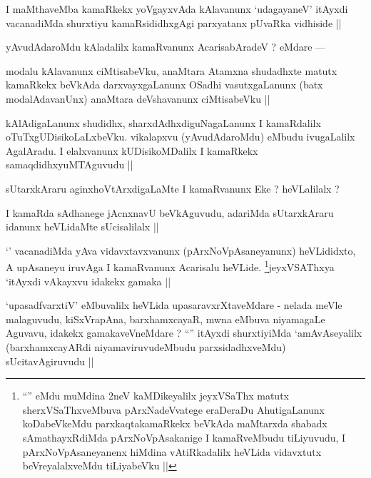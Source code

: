 
\begin{artha}
I maMthaveMba kamaRkekx yoVgayxvAda kAlavanunx `udagayaneV' itAyxdi vacanadiMda shurxtiyu kamaRsididhxgAgi parxyatanx pUvaRka vidhiside ||
\end{artha}

\begin{artha}
yAvudAdaroMdu kAladalilx kamaRvanunx AcarisabAradeV ? eMdare ---
\end{artha}

\begin{artha}
modalu kAlavanunx ciMtisabeVku, anaMtara Atamxna shudadhxte matutx kamaRkekx beVkAda darxvayxgaLanunx OSadhi vasutxgaLanunx (batx modalAdavanUnx) anaMtara deVshavanunx ciMtisabeVku ||
\end{artha}

\begin{artha}
kAlAdigaLanunx shudidhx, sharxdAdhxdiguNagaLanunx I kamaRdalilx oTuTxgUDisikoLaLxbeVku. vikalapxvu (yAvudAdaroMdu) eMbudu ivugaLalilx AgalAradu. I elalxvanunx kUDisikoMDalilx I kamaRkekx samaqdidhxyuMTAguvudu ||
\end{artha}

\begin{artha}
sUtarxkAraru aginxhoVtArxdigaLaMte I kamaRvanunx Eke ? heVLalilalx ?
\end{artha}

\begin{artha}
I kamaRda sAdhanege jAcnxnavU beVkAguvudu, adariMda sUtarxkAraru idanunx heVLidaMte sUcisalilalx ||
\end{artha}

\begin{artha}
`\stext' vacanadiMda yAva vidavxtavxvanunx (pArxNoVpAsaneyanunx) heVLididxto, A upAsaneyu iruvAga I kamaRvanunx Acarisalu heVLide. \footnote{``\stext'' eMdu muMdina 2neV kaMDikeyalilx jeyxVSaThx matutx sherxVSaThxveMbuva pArxNadeVvatege eraDeraDu AhutigaLanunx koDabeVkeMdu parxkaqtakamaRkekx beVkAda maMtarxda shabadx sAmathayxRdiMda pArxNoVpAsakanige I kamaRveMbudu tiLiyuvudu, I pArxNoVpAsaneyanenx hiMdina vAtiRkadalilx heVLida vidavxtutx beVreyalalxveMdu tiLiyabeVku ||}jeyxVSAThxya `itAyxdi vAkayxvu idakekx gamaka ||
\end{artha}

\begin{artha}
`upasadfvarxtiV' eMbuvalilx heVLida upasaravxrXtaveMdare - nelada meVle malaguvudu, kiSxVrapAna, barxhamxcayaR, mwna eMbuva niyamagaLe Aguvavu, idakekx gamakaveVneMdare ? ``\stext'' itAyxdi shurxtiyiMda `amAvAseyalilx (barxhamxcayARdi niyamaviruvudeMbudu parxsidadhxveMdu) sUcitavAgiruvudu ||
\end{artha}

